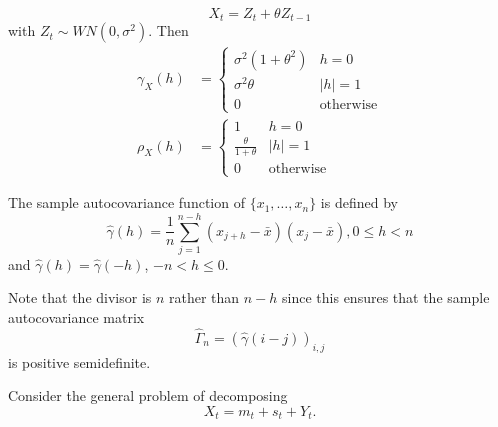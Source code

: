 \begin{exmp}
  \label{defn:time_series:11}
  \begin{equation}
    \label{eq:5}
    X_{t} = Z_{t} + \theta Z_{t-1}
  \end{equation}
  with $Z_{t} \sim WN(0, \sigma^{2})$.  Then
  \begin{align}
    \label{eq:6}
    \gamma_{X}(h) &=
    \begin{cases}
      \sigma^{2}(1 + \theta^{2}) & h = 0 \\
      \sigma^{2} \theta & |h| = 1 \\
      0 & \text{otherwise}
    \end{cases} \\
    \rho_{X}(h) &=
    \begin{cases}
      1 & h = 0 \\
      \frac{\theta}{1 + \theta} & |h| = 1 \\
      0 & \text{otherwise}
    \end{cases}
  \end{align}
\end{exmp}

\begin{defn}
  \label{defn:time_series:12}
  The sample autocovariance function of $\{ x_{1}, \dots, x_{n} \}$ is
  defined by
  \begin{equation}
    \label{eq:7}
    \hat \gamma(h) = \frac{1}{n} \sum_{j=1}^{n-h} (x_{j+h} - \bar
    x)(x_{j} - \bar x), 0 \leq h < n
  \end{equation} and $\hat \gamma(h) = \hat \gamma(-h)$, $-n < h \leq
  0$.

  Note that the divisor is $n$ rather than $n-h$ since this ensures
  that the sample autocovariance matrix
  \begin{equation}
    \label{eq:8}
    \hat \Gamma_{n} = (\hat \gamma(i - j))_{i, j}
  \end{equation} is positive semidefinite.
\end{defn}

Consider the general problem of decomposing
\begin{equation}
  \label{eq:9}
  X_{t} = m_{t} + s_{t} + Y_{t}.
\end{equation}

